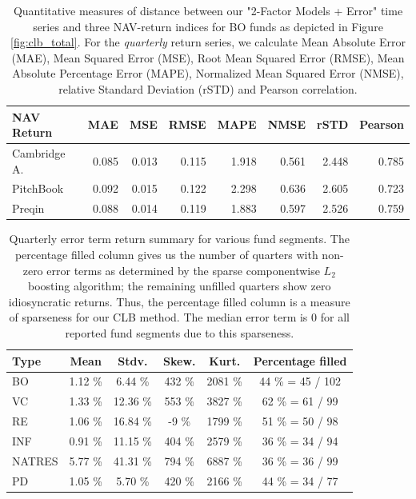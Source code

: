 \documentclass[12pt]{article}
\begin{document}

\begin{table}[ht]
	\centering
	\begin{tabular}{l rrrrrrr}
		{NAV Return} & {MAE} & {MSE} & {RMSE} & {MAPE} & {NMSE} & {rSTD} & {Pearson} \\ 
		\hline
		\hline
		Cambridge A. & 0.085 & 0.013 & 0.115 & 1.918 & 0.561 & 2.448 & 0.785 \\  
	 	PitchBook & 0.092 & 0.015 & 0.122 & 2.298 & 0.636 & 2.605 & 0.723 \\   
	 	Preqin & 0.088 & 0.014 & 0.119 & 1.883 & 0.597 & 2.526 & 0.759 \\ 
		\hline
		\hline
	\end{tabular}
	\caption{
		Quantitative measures of distance between our "2-Factor Models + Error" time series and three NAV-return indices for BO funds as depicted in Figure \ref{fig:clb_total}.
		For the \emph{quarterly} return series, we calculate 
		Mean Absolute Error (MAE),
		Mean Squared Error (MSE),
		Root Mean Squared Error (RMSE),
		Mean Absolute Percentage Error (MAPE),
		Normalized Mean Squared Error (NMSE),
		relative Standard Deviation (rSTD)
		and Pearson correlation.
		}
	\label{tab:accuracy_measures}
\end{table}


\begin{table}[ht]
	\centering
	\begin{tabular}{l | c c c c | c}
		Type & Mean  & Stdv. & Skew. & Kurt.  & Percentage filled \\
		\hline 
		\hline
		BO & 1.12 \% & 6.44 \% & 432 \% & 2081 \% & 44 \% = 45 / 102  \\ 
		VC & 1.33 \% & 12.36 \% &  553 \% & 3827 \% & 62 \% = 61 / 99 \\ 
		RE & 1.06 \% & 16.84 \% & -9 \% & 1799 \% & 51 \% = 50 / 98 \\ 
		INF & 0.91 \% & 11.15 \% & 404 \% & 2579 \% & 36 \% = 34 / 94  \\ 
		NATRES  & 5.77 \% & 41.31 \% & 794 \% & 6887 \% & 36 \% = 36 / 99 \\ 
		PD & 1.05 \% & 5.70 \% & 420 \% & 2166 \% & 44 \% = 34 / 77 \\ 
		\hline 
		\hline 
	\end{tabular} 
	\caption{
		Quarterly error term return summary for various fund segments.
		The percentage filled column gives us the number of quarters with non-zero error terms as determined by the sparse componentwise $L_2$ boosting algorithm; the remaining unfilled quarters show zero idiosyncratic returns.
		Thus, the percentage filled column is a measure of sparseness for our CLB method.
		The median error term is 0 for all reported fund segments due to this sparseness.
	}
\label{tab:error_summary}
\end{table}
\end{document}
